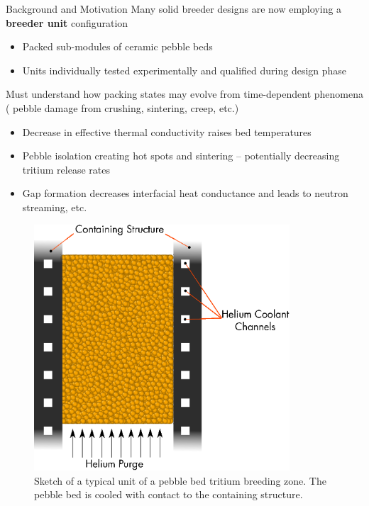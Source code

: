 
\begin{frame}{Background and Motivation}
Many solid breeder designs are now employing a \textbf{breeder unit} configuration
\begin{itemize}
	\item Packed sub-modules of ceramic pebble beds
	\item Units individually tested experimentally and qualified during design phase
\end{itemize}

Must understand how packing states may evolve from time-dependent phenomena ( pebble damage from crushing, sintering, creep, etc.)
\begin{itemize}
	\item Decrease in effective thermal conductivity raises bed temperatures
	\item Pebble isolation creating hot spots and sintering -- potentially decreasing tritium release rates
\item Gap formation decreases interfacial heat conductance and leads to neutron streaming, etc.
\end{itemize}

\end{frame}

\begin{frame}
\begin{figure}
	\centering
	\includegraphics[width=0.85\textwidth]{chapters/figures/solid_breeder_sketch} 
	\caption{Sketch of a typical unit of a pebble bed tritium breeding zone. The pebble bed is cooled with contact to the containing structure.}
	\label{fig:solid-breeder-sketch}
\end{figure}
\end{frame}


